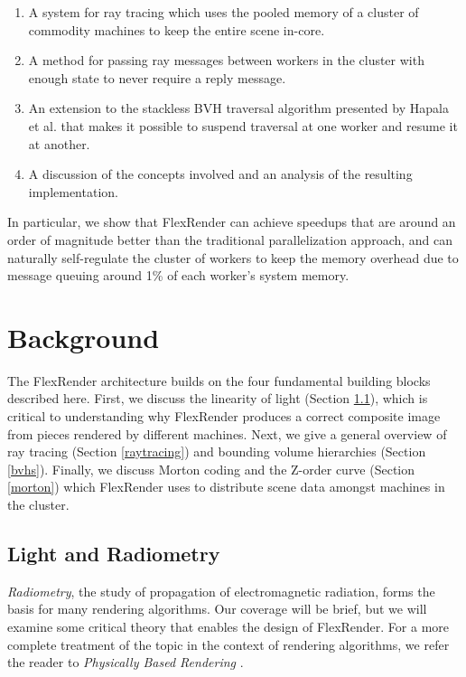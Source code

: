 \documentclass[12pt]{ucthesis}
\begin{document}
\begin{enumerate}
    \item A system for ray tracing which uses the pooled memory of a cluster of
        commodity machines to keep the entire scene in-core.
    \item A method for passing ray messages between workers in the cluster with
        enough state to never require a reply message.
    \item An extension to the stackless BVH traversal algorithm presented by
        Hapala et al. \cite{hapala:2011} that makes it possible to suspend
        traversal at one worker and resume it at another.
    \item A discussion of the concepts involved and an analysis of the resulting
        implementation.
\end{enumerate}

In particular, we show that FlexRender can achieve speedups that are around an
order of magnitude better than the traditional parallelization approach, and can
naturally self-regulate the cluster of workers to keep the memory overhead due
to message queuing around 1\% of each worker's system memory.

\chapter{Background}
\label{background}

The FlexRender architecture builds on the four fundamental building blocks
described here. First, we discuss the linearity of light (Section \ref{radiometry}),
which is critical to understanding why FlexRender produces a correct composite
image from pieces rendered by different machines. Next, we give a general
overview of ray tracing (Section \ref{raytracing}) and bounding volume hierarchies
(Section \ref{bvhs}). Finally, we discuss Morton coding and the Z-order curve
(Section \ref{morton}) which FlexRender uses to distribute scene data amongst
machines in the cluster.

\section{Light and Radiometry}
\label{radiometry}

\emph{Radiometry}, the study of propagation of electromagnetic radiation, forms
the basis for many rendering algorithms. Our coverage will be brief, but we will
examine some critical theory that enables the design of FlexRender. For a more
complete treatment of the topic in the context of rendering algorithms, we refer
the reader to \emph{Physically Based Rendering} \cite{pbrt}.
\end{document}
